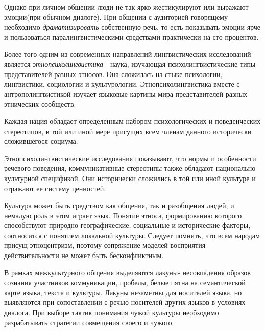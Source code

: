 \documentclass[a4paper,12pt]{article}
\begin{document}
\begin{large}
 Однако при личном общении люди не так ярко жестикулируют или выражают эмоции(при обычном диалоге). 
 При общении с аудиторией говорящему необходимо \textit{драматизировать} собственную речь, то есть показывать эмоции ярче и пользоваться паралингвистическими
 средствами практически на сто процентов.
 
 Более того одним из современных направлений лингвистических исследований является
 \textit{этнопсихолингвистика} - наука, изучающая психолингвистические типы представителей разных этносов. Она сложилась на стыке психологии, лингвистики, социологии и культурологии.
 Этнопсихолингвистика вместе с антрополингвистикой изучает языковые картины мира представителей разных этнических сообществ.
 
 Каждая нация обладает определенным набором психологических и поведенческих стереотипов, в той или иной мере присущих всем членам данного исторически сложившегося
 социума. 
 
 Этнопсихолингвистические исследования показывают, что нормы и особенности речевого поведения, коммуникативные стереотипы также обладают национально-культурной
 спецификой. Они исторически сложились в той или иной культуре и отражают ее систему
 ценностей.
 
 Культура может быть средством как общения, так и разобщения людей, и немалую роль в этом играет язык.
 Понятие этноса, формированию которого способствуют
 природно-географические, социальные и исторические факторы, соотносится с понятием локальной культуры. Следует помнить, что всем народам присущ этноцентризм, поэтому сопряжение моделей восприятия действительности не может быть бесконфликтным.
 
 В рамках межкультурного общения выделяются лакуны- несовпадения образов сознания участников коммуникации, пробелы, белые пятна на семантической карте языка, текста и
 культуры. Лакуны незаметны для носителей языка, но выявляются при сопоставлении с речью носителей других языков в условиях диалога. При выборе тактик понимания чужой культуры необходимо разрабатывать стратегии совмещения своего и чужого.
\end{large}
\end{document}
